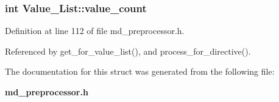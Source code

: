 \subsubsection{\setlength{\rightskip}{0pt plus 5cm}int \bf{Value\_\-List::value\_\-count}}\label{structValue__List_ea4537ab4084f0699a28b7fd6de59de1}




Definition at line 112 of file md\_\-preprocessor.h.

Referenced by get\_\-for\_\-value\_\-list(), and process\_\-for\_\-directive().

The documentation for this struct was generated from the following file:\begin{CompactItemize}
\item 
\bf{md\_\-preprocessor.h}\end{CompactItemize}
